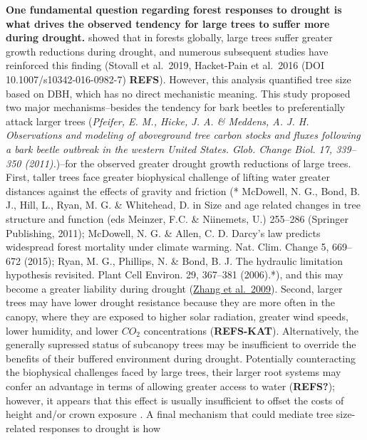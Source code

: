 \documentclass[]{article}
\begin{document}
\textbf{One fundamental question regarding forest responses to drought
is what drives the observed tendency for large trees to suffer more
during drought.} \citet{bennett_larger_2015} showed that in forests
globally, large trees suffer greater growth reductions during drought,
and numerous subsequent studies have reinforced this finding (Stovall et
al.~2019, Hacket-Pain et al.~2016 (DOI 10.1007/s10342-016-0982-7)
\textbf{REFS}). However, this analysis quantified tree size based on
DBH, which has no direct mechanistic meaning. This study proposed two
major mechanisms--besides the tendency for bark beetles to
preferentially attack larger trees (\emph{Pfeifer, E. M., Hicke, J. A.
\& Meddens, A. J. H. Observations and modeling of aboveground tree
carbon stocks and fluxes following a bark beetle outbreak in the western
United States. Glob. Change Biol. 17, 339--350 (2011).})--for the
observed greater drought growth reductions of large trees. First, taller
trees face greater biophysical challenge of lifting water greater
distances against the effects of gravity and friction (* McDowell, N.
G., Bond, B. J., Hill, L., Ryan, M. G. \& Whitehead, D. in Size and age
related changes in tree structure and function (eds Meinzer, F.C. \&
Niinemets, U.) 255--286 (Springer Publishing, 2011); McDowell, N. G. \&
Allen, C. D. Darcy's law predicts widespread forest mortality under
climate warming. Nat. Clim. Change 5, 669--672 (2015); Ryan, M. G.,
Phillips, N. \& Bond, B. J. The hydraulic limitation hypothesis
revisited. Plant Cell Environ. 29, 367--381 (2006).*), and this may
become a greater liability during drought
(\href{https://www.researchgate.net/publication/26322653_Size-dependent_mortality_in_a_Neotropical_savanna_tree_The_role_of_height-related_adjustments_in_hydraulic_architecture_and_carbon_allocation}{Zhang
et al.~2009}). Second, larger trees may have lower drought resistance
because they are more often in the canopy, where they are exposed to
higher solar radiation, greater wind speeds, lower humidity, and lower
\(CO_2\) concentrations (\textbf{REFS-KAT}). Alternatively, the
generally supressed status of subcanopy trees may be insufficient to
override the benefits of their buffered environment during drought.
Potentially counteracting the biophysical challenges faced by large
trees, their larger root systems may confer an advantage in terms of
allowing greater access to water (\textbf{REFS?}); however, it appears
that this effect is usually insufficient to offset the costs of height
and/or crown exposure \citep{bennett_larger_2015}. A final mechanism
that could mediate tree size-related responses to drought is how
\end{document}
